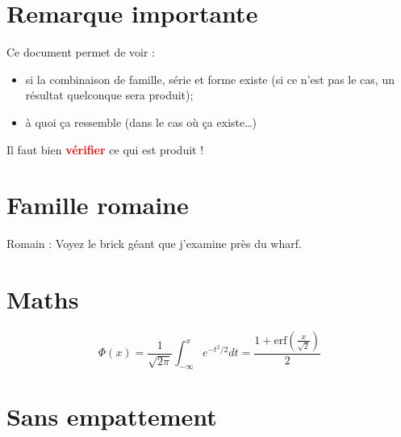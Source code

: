 \documentclass[10pt,a4paper]{report}
\makeatletter
\newcommand{\showfont}{encoding: \f@encoding{},
	family: \f@family{},
	series: \f@series{},
	shape: \f@shape{},
	size: \f@size{}
	\newline
}
\makeatother
\begin{document}
\section{Remarque importante}

Ce document permet de voir :
\begin{itemize}
	\item si la combinaison de famille, série et forme existe (si ce n'est pas le cas, un résultat quelconque sera produit);
	\item à quoi ça ressemble (dans le cas où ça existe\dots)
\end{itemize}

Il faut bien \textcolor{red}{\textbf{vérifier}} ce qui est produit !


	
\section{Famille romaine}

%
%
%
%

\textrm{Romain : Voyez le brick géant que j'examine près du wharf.}\\[1ex]




\section{Maths}

\[
	\Phi(x) = \frac{1}{\sqrt{2\pi}} \int^{x}_{-\infty} e^{-t^2/2}dt = \frac{1+\textrm{erf}\left(\frac{x}{\sqrt{2}}\right)}{2}
\]





\section{Sans empattement}
\end{document}
